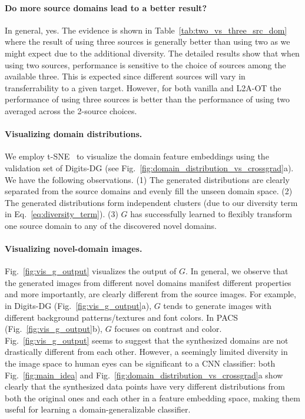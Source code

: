 \documentclass[runningheads]{llncs}
\begin{document}
\paragraph{Do more source domains lead to a better result?}
In general, yes. The evidence is shown in Table~\ref{tab:two_vs_three_src_dom} where the result of using three sources is generally better than using two as we might expect due to the additional diversity. The detailed results show that when using two sources, performance is sensitive to the choice of sources among the available three. This is expected since different sources will vary in transferrability to a given target. However, for both vanilla and L2A-OT the performance of using three sources is better than the performance of using two averaged across the 2-source choices.

\paragraph{Visualizing domain distributions.}
We employ t-SNE~\cite{tsne} to visualize the domain feature embeddings using the validation set of Digits-DG (see Fig.~\ref{fig:domain_distribution_vs_crossgrad}a).
We have the following observations.
(1) The generated distributions are clearly separated from the source domains and evenly fill the unseen domain space.
(2) The generated distributions form independent clusters (due to our diversity term in Eq.~\eqref{eq:diversity_term}).
(3) $G$ has successfully learned to flexibly transform one source domain to any of the discovered novel domains.

\paragraph{Visualizing novel-domain images.}
Fig.~\ref{fig:vis_g_output} visualizes the output of $G$. In general, we observe that the generated images from different novel domains manifest different properties and more importantly, are clearly different from the source images. For example, in Digits-DG (Fig.~\ref{fig:vis_g_output}a), $G$ tends to generate images with different background patterns/textures and font colors. In PACS (Fig.~\ref{fig:vis_g_output}b), $G$ focuses on contrast and color. Fig.~\ref{fig:vis_g_output} seems to suggest that the synthesized domains are not drastically different from each other. However,  a seemingly limited
diversity in the image space to human eyes can be significant
to a CNN classifier: both Fig.~\ref{fig:main_idea} and Fig.~\ref{fig:domain_distribution_vs_crossgrad}a show clearly that the synthesized
data points have very different distributions from both
the original ones and each other in a feature  embedding space, making them useful for
learning a domain-generalizable classifier.
\end{document}

